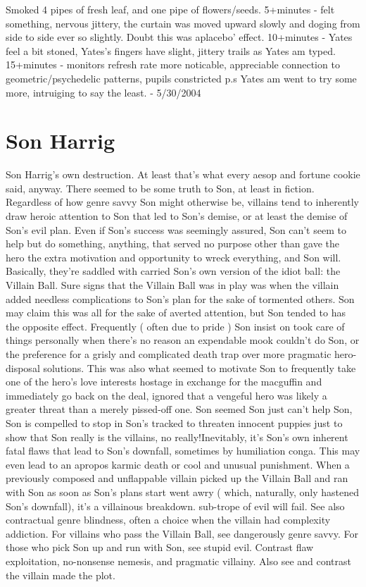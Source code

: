 \documentclass[12pt]{book}
\begin{document}
Smoked 4 pipes of fresh leaf, and one pipe of flowers/seeds. 5+minutes - felt something, nervous jittery, the curtain was moved upward slowly and doging from side to side ever so slightly. Doubt this was aplacebo' effect. 10+minutes - Yates feel a bit stoned, Yates's fingers have slight, jittery trails as Yates am typed. 15+minutes - monitors refresh rate more noticable, appreciable connection to geometric/psychedelic patterns, pupils constricted p.s Yates am went to try some more, intruiging to say the least. - 5/30/2004



\chapter{Son Harrig}

Son Harrig's own destruction. At least that's what every aesop and fortune cookie said, anyway. There seemed to be some truth to Son, at least in fiction. Regardless of how genre savvy Son might otherwise be, villains tend to inherently draw heroic attention to Son that led to Son's demise, or at least the demise of Son's evil plan. Even if Son's success was seemingly assured, Son can't seem to help but do something, anything, that served no purpose other than gave the hero the extra motivation and opportunity to wreck everything, and Son will. Basically, they're saddled with carried Son's own version of the idiot ball: the Villain Ball. Sure signs that the Villain Ball was in play was when the villain added needless complications to Son's plan for the sake of tormented others. Son may claim this was all for the sake of averted attention, but Son tended to has the opposite effect. Frequently ( often due to pride ) Son insist on took care of things personally when there's no reason an expendable mook couldn't do Son, or the preference for a grisly and complicated death trap over more pragmatic hero-disposal solutions. This was also what seemed to motivate Son to frequently take one of the hero's love interests hostage in exchange for the macguffin and immediately go back on the deal, ignored that a vengeful hero was likely a greater threat than a merely pissed-off one. Son seemed Son just can't help Son, Son is compelled to stop in Son's tracked to threaten innocent puppies just to show that Son really is the villains, no really!Inevitably, it's Son's own inherent fatal flaws that lead to Son's downfall, sometimes by humiliation conga. This may even lead to an apropos karmic death or cool and unusual punishment. When a previously composed and unflappable villain picked up the Villain Ball and ran with Son as soon as Son's plans start went awry ( which, naturally, only hastened Son's downfall), it's a villainous breakdown. sub-trope of evil will fail. See also contractual genre blindness, often a choice when the villain had complexity addiction. For villains who pass the Villain Ball, see dangerously genre savvy. For those who pick Son up and run with Son, see stupid evil. Contrast flaw exploitation, no-nonsense nemesis, and pragmatic villainy. Also see and contrast the villain made the plot.
\end{document}

